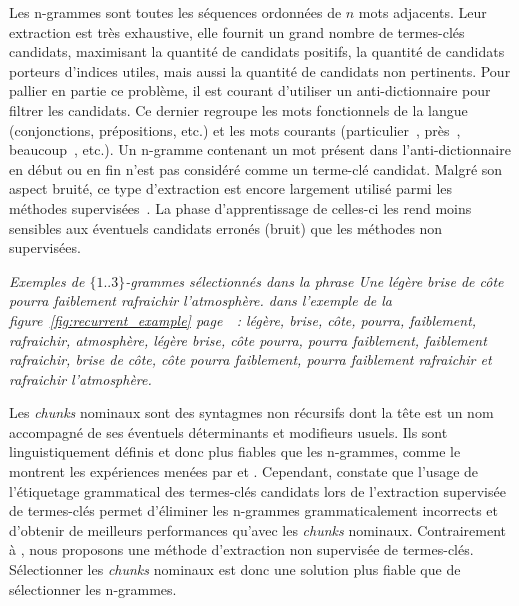     Les n-grammes sont toutes les séquences ordonnées de $n$ mots adjacents. Leur extraction est très exhaustive, elle fournit un
    grand nombre de termes-clés candidats, maximisant la quantité de candidats
    positifs, la quantité de candidats porteurs d'indices utiles, mais aussi la
    quantité de candidats non pertinents. Pour pallier en partie ce problème, il
    est courant d'utiliser un anti-dictionnaire pour filtrer les candidats. Ce
    dernier regroupe les mots fonctionnels de la langue (conjonctions,
    prépositions, etc.) et les mots courants (\og particulier~\fg, \og près~\fg,
    \og beaucoup~\fg, etc.). Un n-gramme contenant un mot présent dans
    l'anti-dictionnaire en début ou en fin n'est pas considéré comme un
    terme-clé candidat. Malgré son aspect bruité, ce type d'extraction est
    encore largement utilisé parmi les méthodes
    supervisées~\cite{witten1999kea,turney1999learningalgorithms,hulth2003keywordextraction}.
    La phase d'apprentissage de celles-ci les rend moins sensibles aux éventuels
    candidats erronés (bruit) que les méthodes non supervisées.

    \textit{Exemples de $\{1..3\}$-grammes sélectionnés dans la phrase \og{}Une
    légère brise de côte pourra faiblement rafraichir l'atmosphère.\fg{} dans
    l'exemple de la figure~\ref{fig:recurrent_example}
    page~\pageref{fig:recurrent_example}~: \og{}légère\fg{}, \og{}brise\fg{},
    \og{}côte\fg{}, \og{}pourra\fg{}, \og{}faiblement\fg{},
    \og{}rafraichir\fg{}, \og{}atmosphère\fg{}, \og{}légère brise\fg{},
    \og{}côte pourra\fg{}, \og{}pourra faiblement\fg{}, \og{}faiblement
    rafraichir\fg{}, \og{}brise de côte\fg{}, \og{}côte pourra faiblement\fg{},
    \og{}pourra faiblement rafraichir\fg{} et \og{}rafraichir
    l'atmosphère\fg{}.}

    Les \textit{chunks} nominaux sont des syntagmes non récursifs dont la tête
    est un nom accompagné de ses éventuels déterminants et modifieurs usuels.
    Ils sont linguistiquement définis et donc plus fiables que les n-grammes,
    comme le montrent les expériences menées par
     et . Cependant, 
    constate que l'usage de l'étiquetage grammatical des termes-clés candidats
    lors de l'extraction supervisée de termes-clés permet d'éliminer les
    n-grammes grammaticalement incorrects et d'obtenir de meilleurs performances
    qu'avec les \textit{chunks} nominaux. Contrairement à
    , nous proposons une méthode
    d'extraction non supervisée de termes-clés. Sélectionner les \textit{chunks}
    nominaux est donc une solution plus fiable que de sélectionner les
    n-grammes.

